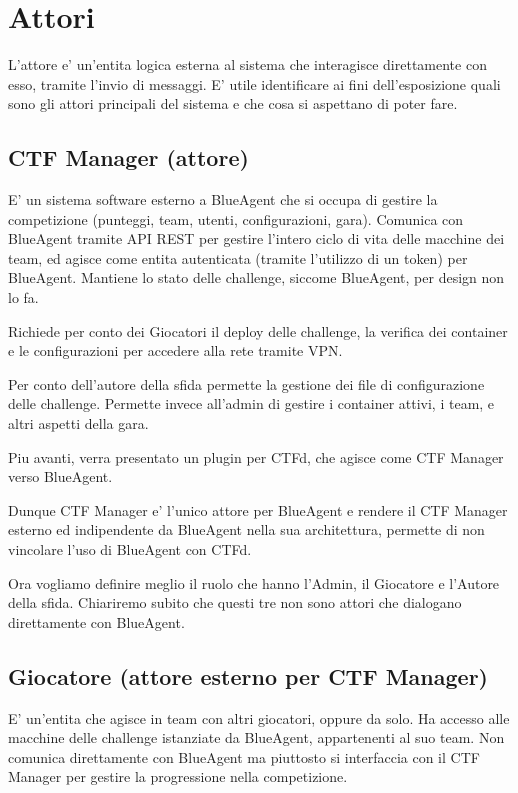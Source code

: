 \section{Attori}\label{attori}

L'attore e' un'entita logica esterna al sistema che interagisce
direttamente con esso, tramite l'invio di messaggi. E' utile
identificare ai fini dell'esposizione quali sono gli attori principali
del sistema e che cosa si aspettano di poter fare.

\subsection{CTF Manager (attore)}\label{ctf-manager-attore}

E' un sistema software esterno a BlueAgent che si occupa di gestire la
competizione (punteggi, team, utenti, configurazioni, gara). Comunica
con BlueAgent tramite API REST per gestire l'intero ciclo di vita delle
macchine dei team, ed agisce come entita autenticata (tramite l'utilizzo
di un token) per BlueAgent. Mantiene lo stato delle challenge, siccome
BlueAgent, per design non lo fa.

Richiede per conto dei Giocatori il deploy delle challenge, la verifica
dei container e le configurazioni per accedere alla rete tramite VPN.

Per conto dell'autore della sfida permette la gestione dei file di
configurazione delle challenge. Permette invece all'admin di gestire i
container attivi, i team, e altri aspetti della gara.

Piu avanti, verra presentato un plugin per CTFd, che agisce come CTF
Manager verso BlueAgent.

Dunque CTF Manager e' l'unico attore per BlueAgent e rendere il CTF
Manager esterno ed indipendente da BlueAgent nella sua architettura,
permette di non vincolare l'uso di BlueAgent con CTFd.

Ora vogliamo definire meglio il ruolo che hanno l'Admin, il Giocatore e
l'Autore della sfida. Chiariremo subito che questi tre non sono attori
che dialogano direttamente con BlueAgent.

\subsection{Giocatore (attore esterno per CTF
Manager)}\label{giocatore-attore-esterno-per-ctf-manager}

E' un'entita che agisce in team con altri giocatori, oppure da solo. Ha
accesso alle macchine delle challenge istanziate da BlueAgent,
appartenenti al suo team. Non comunica direttamente con BlueAgent ma
piuttosto si interfaccia con il CTF Manager per gestire la progressione
nella competizione.

